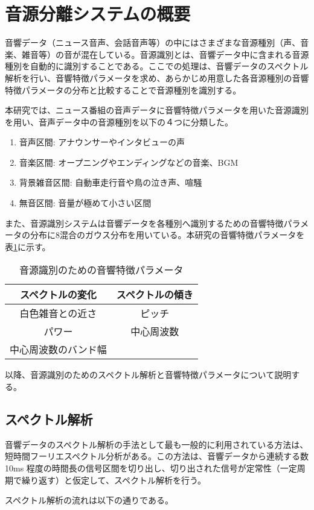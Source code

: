 \section{音源分離システムの概要}
\renewcommand{\labelenumi}{(\arabic{enumi})}
音響データ（ニュース音声、会話音声等）の中にはさまざまな音源種別（声、音楽、雑音等）の音が混在している。音源識別とは、音響データ中に含まれる音源種別を自動的に識別することである。ここでの処理は、音響データのスペクトル解析を行い、音響特徴パラメータを求め、あらかじめ用意した各音源種別の音響特徴パラメータの分布と比較することで音源種別を識別する。\par
本研究では、ニュース番組の音声データに音響特徴パラメータを用いた音源識別\cite{shimae_9} を用い、音声データ中の音源種別を以下の４つに分類した。

\begin{enumerate}
\item 音声区間: アナウンサーやインタビューの声
\item 音楽区間: オープニングやエンディングなどの音楽、BGM
\item 背景雑音区間: 自動車走行音や鳥の泣き声、喧騒
\item 無音区間: 音量が極めて小さい区間
\end{enumerate}

また、音源識別システムは音響データを各種別へ識別するための音響特徴パラメータの分布に8混合のガウス分布を用いている。本研究の音響特徴パラメータを表\ref{table:feature_devide_audio}に示す。
\begin{table}[H]
  \begin{center}
    \caption{音源識別のための音響特徴パラメータ}
    \label{table:feature_devide_audio}
    \begin{tabular}{|c|c|} \hline
      スペクトルの変化 & スペクトルの傾き\\ \hline
      白色雑音との近さ & ピッチ  \\ \hline
      パワー & 中心周波数 \\  \hline
      中心周波数のバンド幅 &   \\ \hline
    \end{tabular}
  \end{center}
\end{table}

以降、音源識別のためのスペクトル解析と音響特徴パラメータについて説明する。\par


\subsection{スペクトル解析}
音響データのスペクトル解析の手法として最も一般的に利用されている方法は、短時間フーリエスペクトル分析がある。この方法は、音響データから連続する数10ms 程度の時間長の信号区間を切り出し、切り出された信号が定常性（一定周期で繰り返す）と仮定して、スペクトル解析を行う。\par
スペクトル解析の流れは以下の通りである。

